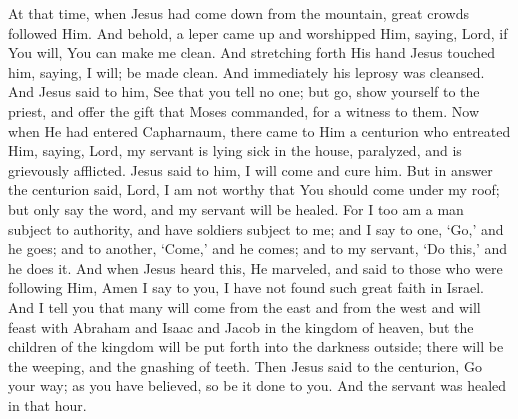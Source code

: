 {{At that time, when Jesus had come down from the mountain, great crowds followed Him. And behold, a leper came up and worshipped Him, saying, Lord, if You will, You can make me clean. And stretching forth His hand Jesus touched him, saying, I will; be made clean. And immediately his leprosy was cleansed. And Jesus said to him, See that you tell no one; but go, show yourself to the priest, and offer the gift that Moses commanded, for a witness to them. Now when He had entered Capharnaum, there came to Him a centurion who entreated Him, saying, Lord, my servant is lying sick in the house, paralyzed, and is grievously afflicted. Jesus said to him, I will come and cure him. But in answer the centurion said, Lord, I am not worthy that You should come under my roof; but only say the word, and my servant will be healed. For I too am a man subject to authority, and have soldiers subject to me; and I say to one, ‘Go,’ and he goes; and to another, ‘Come,’ and he comes; and to my servant, ‘Do this,’ and he does it. And when Jesus heard this, He marveled, and said to those who were following Him, Amen I say to you, I have not found such great faith in Israel. And I tell you that many will come from the east and from the west and will feast with Abraham and Isaac and Jacob in the kingdom of heaven, but the children of the kingdom will be put forth into the darkness outside; there will be the weeping, and the gnashing of teeth. Then Jesus said to the centurion, Go your way; as you have believed, so be it done to you. And the servant was healed in that hour.
  }
}
\newcommand{\offertory}{%
Déxtera Dómini fecit virtutem, déxtera Dómini exaltávit me: non móriar, sed vivam, et narrábo ópera Dómini.
}
\newcommand{\offertoryTranslation}{%
The right hand of the Lord has struck with power: the right hand of the Lord has exalted me; I shall not die, but live, and declare the works of the Lord.
}
\newcommand{\secret}{%
  \l{%
Hæc hóstia, Dómine, quǽsumus, emúndet nostra delícta: et, ad sacrifícium celebrándum, subditórum tibi córpora mentésque sanctíficet.
  }
  \e{%
May this offering, O Lord, we beseech You, wipe away our transgressions, and make holy the minds and bodies of Your servants for celebrating this sacrifice.
  }
  \perDominum
}
\newcommand{\communion}{%
Mirabántur omnes de his, quæ procedébant de ore Dei.
}
\newcommand{\communionTranslation}{%
All marvelled at the words that came from the mouth of God.
}
\newcommand{\postcommunion}{%
  \l{%
Quos tantis, Dómine, largíris uti mystériis: quǽsumus; ut efféctibus nos eórum veráciter aptáre dignéris.
  }
  \e{%
O Lord, as You grant us to use this great sacrament, deign, we beseech You, to make us truly worthy of its fruits.
  }
  \perDominum
}

